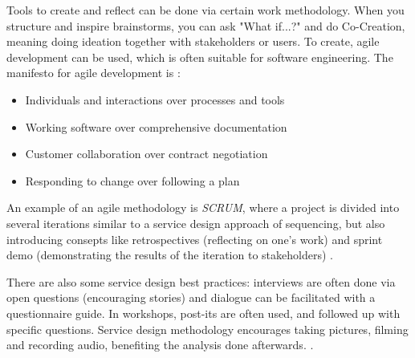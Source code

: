 Tools to create and reflect can be done via certain work methodology. When you structure and inspire brainstorms, you can ask "What if...?" and do Co-Creation, meaning doing ideation together with stakeholders or users. To create, agile development can be used, which is often suitable for software engineering. The manifesto for agile development is \cite{agile-manifesto}:

\begin{itemize}
\item Individuals and interactions over processes and tools
\item Working software over comprehensive documentation
\item Customer collaboration over contract negotiation
\item Responding to change over following a plan
\end{itemize}

An example of an agile methodology is \textit{SCRUM}, where a project is divided into several iterations similar to a service design approach of sequencing, but also introducing consepts like retrospectives (reflecting on one's work) and sprint demo (demonstrating the results of the iteration to stakeholders) \cite{kniberg}.

There are also some service design best practices: interviews are often done via open questions (encouraging stories) and dialogue can be facilitated with a questionnaire guide. In workshops, post-its are often used, and followed up with specific questions. Service design methodology encourages taking pictures, filming and recording audio, benefiting the analysis done afterwards. \cite{expedition-mondial}.

%


%

%
